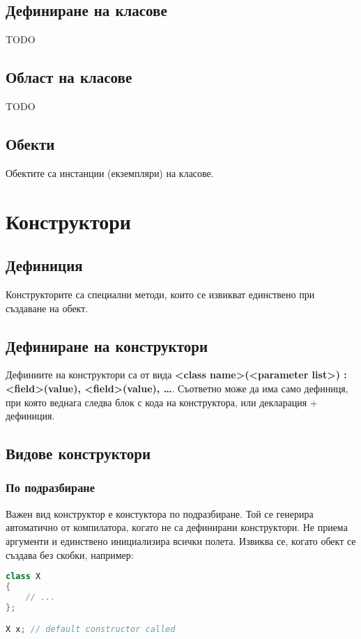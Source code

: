 \documentclass[fleqn,12pt]{article}
\begin{document}
\subsection{Дефиниране на класове}
TODO

\subsection{Област на класове}
TODO

\subsection{Обекти}
Обектите са инстанции (екземпляри) на класове.

\section{Конструктори}
\subsection{Дефиниция}
Конструкторите са специални методи, които се извикват единствено при създаване на обект.

\subsection{Дефиниране на конструктори}
Дефиниите на конструктори са от вида \textbf{<class name>(<parameter list>) : <field>(value), <field>(value), \dots}.
Съответно може да има само дефиниця, при която веднага следва блок с кода на конструктора,
или декларация + дефиниция.

\subsection{Видове конструктори}
\subsubsection{По подразбиране}
Важен вид конструктор е констуктора по подразбиране. Той се генерира автоматично от компилатора, 
когато не са дефинирани конструктори. Не приема аргументи и единствено инициализира всички полета.
Извиква се, когато обект се създава без скобки, например:
\begin{lstlisting}[language=C++, caption=Default constructor]
class X
{
    // ...
};

X x; // default constructor called
\end{lstlisting}
\end{document}
